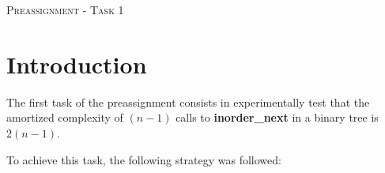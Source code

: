 \documentclass[12p]{article}
\begin{document}


  \newpage 				%



  \tableofcontents 			%



  \newpage 				%







\begin{center}

  \textsc{\LARGE Preassignment - Task 1}\\[1cm] %

\end{center}

 
  \section{Introduction}			%

  \large The first task of the preassignment consists in experimentally test that the amortized complexity of $(n-1)$ calls to \textbf {inorder\_next} in a binary tree is $2(n-1)$.

\bigskip

 \large To achieve this task, the following strategy was followed:
\end{document}

